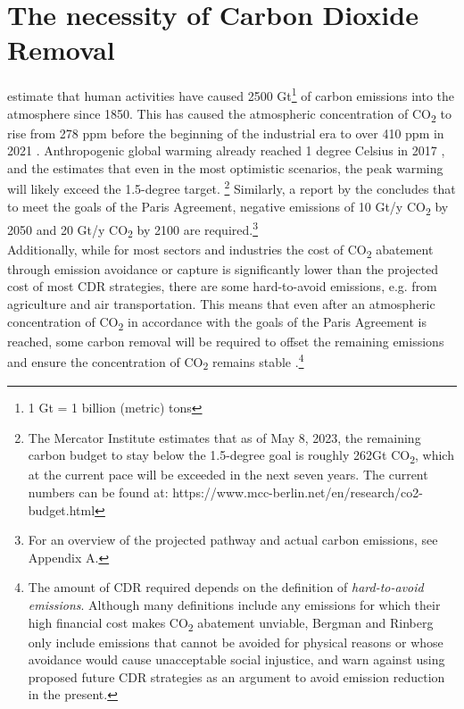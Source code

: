 \section{The necessity of Carbon Dioxide Removal}
\textcite{Bergman2021TheJustice} estimate that human activities have caused 2500 Gt\footnote{ 1 Gt = 1 billion (metric) tons} of carbon emissions into the atmosphere since 1850. This has caused the atmospheric concentration of CO\textsubscript{2} to rise from 278 ppm before the beginning of the industrial era to over 410 ppm in 2021 \parencite[5]{Friedlingstein2022Global2022}. Anthropogenic global warming already reached 1 degree Celsius in 2017 \parencite[6]{IPCC2018Global1.5C}, and the \textcite[30]{UNEP2022Emissions2022} estimates that even in the most optimistic scenarios, the peak warming will likely exceed the 1.5-degree target. \footnote{The Mercator Institute estimates that as of May 8, 2023, the remaining carbon budget to stay below the 1.5-degree goal is roughly 262Gt CO\textsubscript{2}, which at the current pace will be exceeded in the next seven years. The current numbers can be found at: https://www.mcc-berlin.net/en/research/co2-budget.html} Similarly, a report by the \textcite[9]{NAS2018NegativeAgenda} concludes that to meet the goals of the Paris Agreement, negative emissions of 10 Gt/y CO\textsubscript{2} by 2050 and 20 Gt/y CO\textsubscript{2} by 2100 are required.\footnote{For an overview of the projected pathway and actual carbon emissions, see Appendix A.}\\
Additionally, while for most sectors and industries the cost of CO\textsubscript{2} abatement through emission avoidance or capture is significantly lower than the projected cost of most CDR strategies, there are some hard-to-avoid emissions, e.g. from agriculture and air transportation. This means that even after an atmospheric concentration of CO\textsubscript{2} in accordance with the goals of the Paris Agreement is reached, some carbon removal will be required to offset the remaining emissions and ensure the concentration of CO\textsubscript{2} remains stable \parencite{NRC2015ClimateSequestration}.\footnote{The amount of CDR required depends on the definition of \textit{hard-to-avoid emissions}. Although many definitions include any emissions for which their high financial cost makes CO\textsubscript{2} abatement unviable, Bergman and Rinberg only include emissions that cannot be avoided for physical reasons or whose avoidance would cause unacceptable social injustice, and warn against using proposed future CDR strategies as an argument to avoid emission reduction in the present.}
